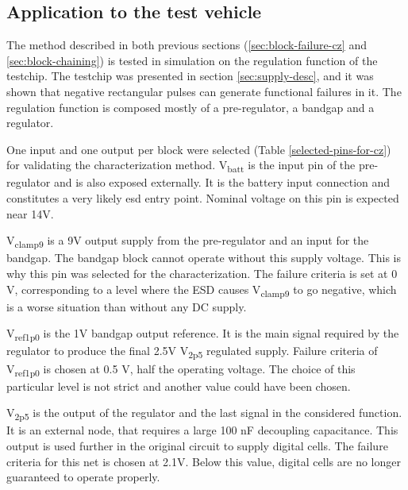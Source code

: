 \subsection{Application to the test vehicle}
\label{sec:application-test-vehicle}

The method described in both previous sections (\ref{sec:block-failure-cz} and \ref{sec:block-chaining}) is tested in simulation on the regulation function of the testchip.
The testchip was presented in section \ref{sec:supply-desc}, and it was shown that negative rectangular pulses can generate functional failures in it.
The regulation function is composed mostly of a pre-regulator, a bandgap and a regulator.

One input and one output per block were selected (Table \ref{selected-pins-for-cz}) for validating the characterization method.
V\textsubscript{batt} is the input pin of the pre-regulator and is also exposed externally.
It is the battery input connection and constitutes a very likely \gls{esd} entry point.
Nominal voltage on this pin is expected near 14V.

V\textsubscript{clamp9} is a 9V output supply from the pre-regulator and an input for the bandgap.
The bandgap block cannot operate without this supply voltage.
This is why this pin was selected for the characterization.
The failure criteria is set at 0 V, corresponding to a level where the ESD causes V\textsubscript{clamp9} to go negative, which is a worse situation than without any DC supply.

V\textsubscript{ref1p0} is the 1V bandgap output reference.
It is the main signal required by the regulator to produce the final 2.5V V\textsubscript{2p5} regulated supply.
Failure criteria of V\textsubscript{ref1p0} is chosen at 0.5 V, half the operating voltage.
The choice of this particular level is not strict and another value could have been chosen.

V\textsubscript{2p5} is the output of the regulator and the last signal in the considered function.
It is an external node, that requires a large 100 nF decoupling capacitance.
This output is used further in the original circuit to supply digital cells.
The failure criteria for this net is chosen at 2.1V.
Below this value, digital cells are no longer guaranteed to operate properly.

